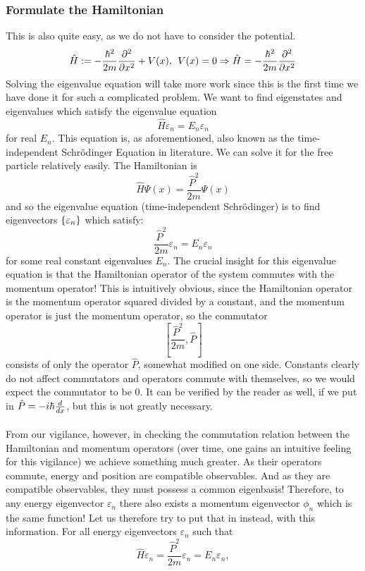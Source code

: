 \subsubsection*{Formulate the Hamiltonian}
This is also quite easy, as we do not have to consider the potential.
$$
\hat{H}:=-\frac{\hbar^2}{2m}\frac{\partial^2}{\partial x^2}+V(x), \:\: V(x)=0 \Rightarrow \hat{H}=-\frac{\hbar^2}{2m}\frac{\partial^2}{\partial x^2}
$$
Solving the eigenvalue equation will take more work since this is the first time we have done it for such a complicated problem. We want to find eigenstates and eigenvalues which satisfy the eigenvalue equation
$$
\hat{H}\varepsilon_{n}=E_{n}\varepsilon_{n}
$$
for real $E_{n}$. This equation is, as aforementioned, also known as the time-independent Schr\"{o}dinger Equation in literature. We can solve it for the free particle relatively easily. The Hamiltonian is
$$
\hat{H}\Psi(x)=\frac{\hat{P}^2}{2m}\Psi(x)
$$
and so the eigenvalue equation (time-independent Schr\"{o}dinger) is to find eigenvectors $\{\varepsilon_{n}\}$ which satisfy:
$$
\frac{\hat{P}^2}{2m}\varepsilon_{n}=E_{n}\varepsilon_{n}
$$
for some real constant eigenvalues $E_{n}$. The crucial insight for this eigenvalue equation is that the Hamiltonian operator of the system commutes with the momentum operator! This is intuitively obvious, since the Hamiltonian operator is the momentum operator squared divided by a constant, and the momentum operator is just the momentum operator, so the commutator 
$$
\left[\frac{\hat{P}^2}{2m},\hat{P}\right]
$$
consists of only the operator $\hat{P}$, somewhat modified on one side. Constants clearly do not affect commutators and operators commute with themselves, so we would expect the commutator to be $0$. It can be verified by the reader as well, if we put in $\hat{P}=-i\hbar\frac{d}{d x}$, but this is not greatly necessary.
\\\\
From our vigilance, however, in checking the commutation relation between the Hamiltonian and momentum operators (over time, one gains an intuitive feeling for this vigilance) we achieve something much greater. As their operators commute, energy and position are compatible observables. And as they are compatible observables, they must possess a common eigenbasis! Therefore, to any energy eigenvector $\varepsilon_{n}$ there also exists a momentum eigenvector $\phi_{n}$ which is the same function! Let us therefore try to put that in instead, with this information. For all energy eigenvectors $\varepsilon_{n}$ such that
$$
\hat{H}\varepsilon_{n}=\frac{\hat{P}^2}{2m}\varepsilon_{n}=E_{n}\varepsilon_{n}, 
$$
